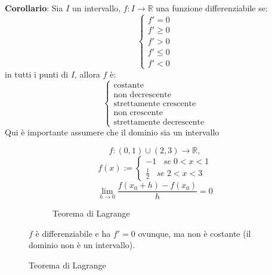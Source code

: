 \documentclass[a4paper]{article}
\theoremstyle{break}
\theoremstyle{break}
\theoremstyle{break}
\theoremstyle{break}
\begin{document}
\textbf{Corollario}: Sia \( I \) un intervallo, \( f: I \to \mathbb{R} \) una funzione
differenziabile se:
\[
  \begin{cases}
    f'=0\\
    f'\ge 0\\
    f'>0\\
    f'\le 0\\
    f'<0
  \end{cases}
\] 
in tutti i punti di \( I \), allora \( f \) è:
\[
  \begin{cases}
    \text{costante}\\
    \text{non decrescente}\\
    \text{strettamente crescente}\\
    \text{non crescente}\\
    \text{strettamente decrescente}
  \end{cases}
\] 
Qui è importante assumere che il dominio sia un intervallo
\begin{figure}[H]
  \begin{example}
    \[ f: (0,1) \cup (2,3) \to \mathbb{R}, \]
    \[
      f(x):=\begin{cases}
        -1 \;\;\; se\; 0<x<1\\
        \frac{1}{2} \;\;\; se\; 2<x<3
      \end{cases}
    \] 
    \[
      \lim_{h \to 0} \frac{f(x_0+h)-f(x_0)}{h} = 0
    \] 
    \begin{figure}[H]
      \begin{center}
      \end{center}
      \caption{Teorema di Lagrange}
    \end{figure}

    \( f \) è differenziabile e ha \( f'=0 \) ovunque, ma non è costante (il dominio non è un intervallo).
  \end{example}
\end{figure}
\end{document}
